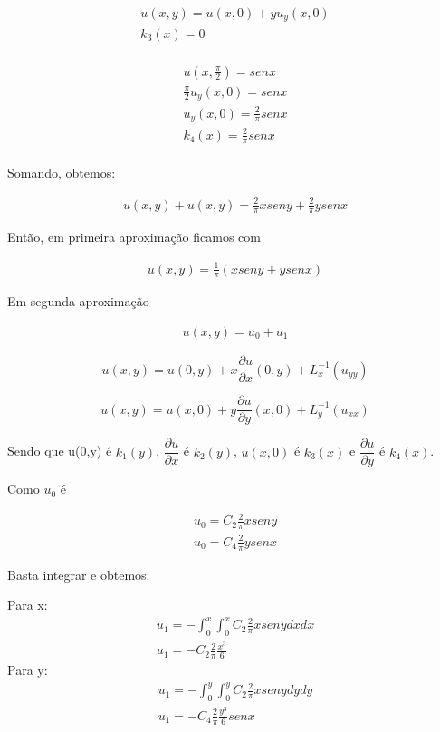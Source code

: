 \begin{gather}
u(x,y) = u(x,0) + yu_{y}(x,0)\nonumber\\
k_{3}(x) = 0\nonumber\\
\end{gather}

\begin{gather}
u\left(x,\frac{\pi}{2}\right) = senx \nonumber\\
\frac{\pi}{2}u_{y}(x,0) = senx\nonumber\\
u_{y}(x,0) = \frac{2}{\pi}senx\nonumber\\
k_{4}(x) = \frac{2}{\pi}senx\nonumber\\
\end{gather}

Somando, obtemos:

\begin{gather}
u(x,y) + u(x,y) = \frac{2}{\pi}xseny + \frac{2}{\pi}ysenx
\end{gather}

Então, em primeira aproximação ficamos com

\begin{gather}
u(x,y) = \frac{1}{\pi}(xseny + ysenx)
\end{gather}

Em segunda aproximação

\begin{gather}
u(x,y) = u_{0} + u_{1}
\end{gather}

\begin{equation*}
u(x,y) = u(0,y) + x\dfrac{\partial u}{\partial x}(0,y) + L_{x}^{-1}(u_{yy})
\end{equation*}

\begin{equation*}
u(x,y) = u(x,0) + y\dfrac{\partial u}{\partial y}(x,0) + L_{y}^{-1}(u_{xx})
\end{equation*}


Sendo que  u(0,y) é $k_{1}(y)$, $\dfrac{\partial u}{\partial x}$ é $k_{2}(y)$, $u(x,0)$ é $k_{3}(x)$ e $\dfrac{\partial u}{\partial y}$ é $k_{4}(x)$.

Como $u_{0}$ é

\begin{gather}
u_{0} = C_{2}\frac{2}{\pi}xseny\nonumber\\
u_{0} = C_{4}\frac{2}{\pi}ysenx
\end{gather}

Basta integrar e obtemos:

Para x:
\begin{gather}
u_{1} = -\int_0^x \int_0^x C_{2}\frac{2}{\pi}xsenydxdx\nonumber\\
u_{1} = -C_{2}\frac{2}{\pi}\frac{x^3}
{6}
\end{gather}
Para y:
\begin{gather}
u_{1} = -\int_0^y \int_0^y C_{2}\frac{2}{\pi}xsenydydy\nonumber\\
u_{1} = -C_{4}\frac{2}{\pi}\frac{y^3}{6}senx
\end{gather}

